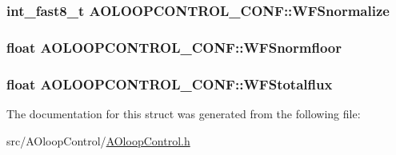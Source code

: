 \subsubsection[{W\+F\+Snormalize}]{\setlength{\rightskip}{0pt plus 5cm}int\+\_\+fast8\+\_\+t A\+O\+L\+O\+O\+P\+C\+O\+N\+T\+R\+O\+L\+\_\+\+C\+O\+N\+F\+::\+W\+F\+Snormalize}\label{structAOLOOPCONTROL__CONF_a78221aaced7c48e38b8ffe3a45e605ca}
\hypertarget{structAOLOOPCONTROL__CONF_abd08de6307435bc1a73849ae8f784169}{}
\subsubsection[{W\+F\+Snormfloor}]{\setlength{\rightskip}{0pt plus 5cm}float A\+O\+L\+O\+O\+P\+C\+O\+N\+T\+R\+O\+L\+\_\+\+C\+O\+N\+F\+::\+W\+F\+Snormfloor}\label{structAOLOOPCONTROL__CONF_abd08de6307435bc1a73849ae8f784169}
\hypertarget{structAOLOOPCONTROL__CONF_ab19e1ec513dfe03aef82717b63466374}{}
\subsubsection[{W\+F\+Stotalflux}]{\setlength{\rightskip}{0pt plus 5cm}float A\+O\+L\+O\+O\+P\+C\+O\+N\+T\+R\+O\+L\+\_\+\+C\+O\+N\+F\+::\+W\+F\+Stotalflux}\label{structAOLOOPCONTROL__CONF_ab19e1ec513dfe03aef82717b63466374}


The documentation for this struct was generated from the following file\+:\begin{DoxyCompactItemize}
\item 
src/\+A\+Oloop\+Control/\hyperlink{AOloopControl_8h}{A\+Oloop\+Control.\+h}\end{DoxyCompactItemize}
